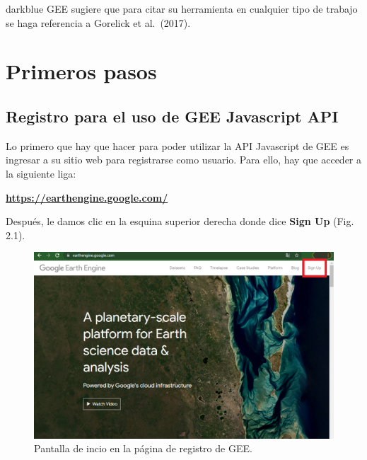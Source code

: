 \documentclass[
  12pt,
  letterpaper,
  twoside]{book}
\begin{document}
\begin{bluebox2}

\begin{awesomeblock}{5pt}{\faLightbulb}{darkblue}
GEE sugiere que para citar su herramienta en cualquier tipo de trabajo se haga referencia a Gorelick et al.~(2017).

\end{awesomeblock}

\end{bluebox2}

\newpage

\hypertarget{primeros-pasos}{%
\chapter{Primeros pasos}\label{primeros-pasos}}

\hypertarget{registro-para-el-uso-de-gee-javascript-api}{%
\section{Registro para el uso de GEE Javascript API}\label{registro-para-el-uso-de-gee-javascript-api}}

Lo primero que hay que hacer para poder utilizar la API Javascript de GEE es ingresar a su sitio web para registrarse como usuario. Para ello, hay que acceder a la siguiente liga:

\textbf{\url{https://earthengine.google.com/}}

Después, le damos clic en la esquina superior derecha donde dice \textbf{Sign Up} (Fig. 2.1).

\begin{figure}[btp]

{\centering \includegraphics[width=1\linewidth]{Img/Signup} 

}

\caption{Pantalla de incio en la página de registro de GEE.}\label{fig:unnamed-chunk-2}
\end{figure}
\end{document}
